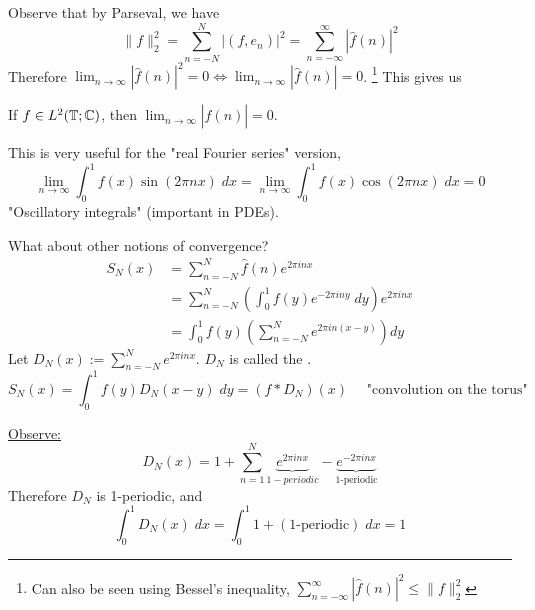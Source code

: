 Observe that by Parseval, we have 
\[
    \| f \|_2^2 = \sum_{n = -N}^N |(f, e_n)|^2 = \sum_{n=-\infty}^\infty |\hat{f}(n)|^2
\] 
Therefore $\lim_{n \to \infty} |\hat{f}(n)|^2 = 0 \iff \lim_{n \to \infty} |\hat{f}(n)| = 0$. 
\footnote{Can also be seen using Bessel's inequality, $\sum_{n = -\infty}^\infty |\hat{f}(n)|^2 \leq \| f \|_2^2$ }
This gives us

\begin{prop}
    If $f \in L^2(\mathbb{T}; \mathbb{C})$, then $\lim_{n \to \infty} |\hat{f}(n)| = 0$.
\end{prop}

\begin{rem}
    This is very useful for the "real Fourier series" version,
    \[
        \lim_{n \to \infty} \int_0^1 f(x) \sin(2 \pi n x) \; dx = \lim_{n \to \infty} \int_0^1 f(x) \cos(2 \pi n x) \; dx = 0
    \] "Oscillatory integrals" (important in PDEs).
\end{rem}

What about other notions of convergence?
\begin{align*}
    S_N(x) &= \sum_{n=-N}^N \hat{f}(n) e^{2 \pi i n x} \\
    &= \sum_{n = -N}^N \left( \int_0^1 f(y) e^{-2 \pi i n y} \; dy \right) e^{2 \pi i n x} \\
    &= \int_0^1 f(y) \left( \sum_{n = -N}^N e^{2 \pi i n (x - y)} \right) dy
\end{align*}
Let $D_N(x) := \sum_{n = -N}^N e^{2 \pi i n x}$. $D_N$ is called the .
\[
    S_N(x) = \int_0^1 f(y) D_N(x - y) \; dy = (f * D_N)(x) \quad \text{ "convolution on the torus"}
\] 

\underline{Observe:}
\[
    D_N(x) = 1 + \sum_{n = 1}^N \underbrace{e^{2 \pi i n x}}_{1-periodic} - \underbrace{e^{-2 \pi i n x}}_{\text{1-periodic}}
\]  
Therefore $D_N$ is 1-periodic, and
\[
    \int_0^1 D_N(x) \; dx = \int_0^1 1 + (\text{1-periodic}) \; dx = 1
\]  

